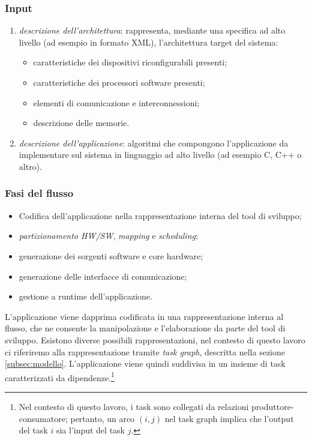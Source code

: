 \subsubsection{Input}
\begin{enumerate}
  \item \emph{descrizione dell'architettura}: rappresenta, mediante una specifica ad alto livello (ad esempio
    in formato XML), l'architettura target del sistema:
    \begin{itemize}
      \item caratteristiche dei dispositivi riconfigurabili presenti;
      \item caratteristiche dei processori software presenti;
      \item elementi di comunicazione e interconnessioni;
      \item descrizione delle memorie.
    \end{itemize}
  \item \emph{descrizione dell'applicazione}: algoritmi che compongono l'applicazione da implementare sul sistema
    in linguaggio ad alto livello (ad esempio C, C++ o altro).
\end{enumerate}

\subsubsection{Fasi del flusso}
\begin{itemize}
  \item Codifica dell'applicazione nella rappresentazione interna del tool di sviluppo;
  \item \emph{partizionamento HW/SW}, \emph{mapping} e \emph{scheduling};
  \item generazione dei sorgenti software e core hardware;
  \item generazione delle interfacce di comunicazione;
  \item gestione a runtime dell'applicazione.
\end{itemize}
L'applicazione viene dapprima codificata in una
rappresentazione interna al flusso, che ne consente la manipolazione e
l'elaborazione da parte del tool di sviluppo. Esistono diverse possibili
rappresentazioni, nel contesto di questo lavoro ci riferiremo alla
rappresentazione tramite \emph{task graph}, descritta nella sezione
\ref{subsec:modello}. L'applicazione viene quindi suddivisa in un
insieme di task caratterizzati da dipendenze.\footnote{Nel contesto di questo
lavoro, i task sono collegati da relazioni produttore-consumatore; pertanto, un arco $(i,j)$ nel task graph implica che
l'output del task $i$ sia l'input del task $j$.}

